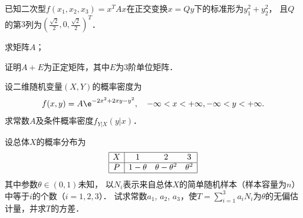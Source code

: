 \documentclass[plain,noanswer,medmath]{../../template/jnuexam}
\begin{document}
\begin{problem}[points=11]
已知二次型$f(x_1,x_2,x_3) = x^T Ax$在正交变换$x = Qy$下的标准形为$y_1^2 + y_2^2$，
且$Q$的第$3$列为$\left(\frac{\sqrt{2}}{2},0,\frac{\sqrt{2}}{2} \right)^T$．\par
\begin{enumerate*}
\item 求矩阵$A$；
\item 证明$A + E$为正定矩阵，其中$E$为$3$阶单位矩阵．
\end{enumerate*}
\end{problem}


\begin{problem}[points=11]
设二维随机变量$(X,Y)$的概率密度为
$$f(x,y) = A\e^{- 2x^2 + 2xy - y^2},\quad -\infty < x < +\infty , -\infty < y < +\infty .$$
求常数$A$及条件概率密度$f_{Y|X}(y|x)$．
\end{problem}


\begin{problem}[points=11]
设总体$X$的概率分布为
$$\begin{array}{|c|ccc|}
\hline
  X &          1 &                 2 & 3 \\
\hline
  P & 1 - \theta & \theta - \theta^2 & \theta^2 \\
\hline
\end{array}$$
其中参数$\theta \in \left(0,1 \right)$未知，
以$N_i$表示来自总体$X$的简单随机样本（样本容量为$n$）中等于$i$的个数（$i = 1,2,3$）．
试求常数$a_1$, $a_2$, $a_3$，使$T = \sum_{i = 1}^3 a_i N_i$为$\theta$的无偏估计量，并求$T$的方差．
\end{problem}
\end{document}
